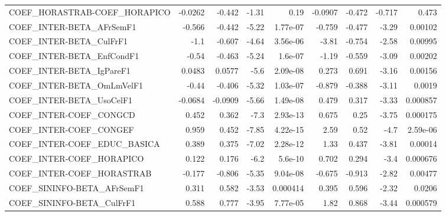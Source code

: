 \begin{tabular}{lrrrrrrrr}
COEF\_HORASTRAB-COEF\_HORAPICO          &     -0.0262 &       -0.442 &    -1.31 &     0.19 &    -0.0907 &      -0.472 &       -0.717 &         0.473 \\
COEF\_INTER-BETA\_AFrSemF1              &      -0.566 &       -0.442 &    -5.22 & 1.77e-07 &     -0.759 &      -0.477 &        -3.29 &       0.00102 \\
COEF\_INTER-BETA\_CulFrF1               &        -1.1 &       -0.607 &    -4.64 & 3.56e-06 &      -3.81 &      -0.754 &        -2.58 &       0.00995 \\
COEF\_INTER-BETA\_EnfCondF1             &       -0.54 &       -0.463 &    -5.24 &  1.6e-07 &      -1.19 &      -0.559 &        -3.09 &       0.00202 \\
COEF\_INTER-BETA\_IgPareF1              &      0.0483 &       0.0577 &     -5.6 & 2.09e-08 &      0.273 &       0.691 &        -3.16 &       0.00156 \\
COEF\_INTER-BETA\_OmLmVelF1             &       -0.44 &       -0.406 &    -5.32 & 1.03e-07 &     -0.879 &      -0.388 &        -3.11 &        0.0019 \\
COEF\_INTER-BETA\_UsoCelF1              &     -0.0684 &      -0.0909 &    -5.66 & 1.49e-08 &      0.479 &       0.317 &        -3.33 &      0.000857 \\
COEF\_INTER-COEF\_CONGCD                &       0.452 &        0.362 &     -7.3 & 2.93e-13 &      0.675 &        0.25 &        -3.75 &      0.000175 \\
COEF\_INTER-COEF\_CONGEF                &       0.959 &        0.452 &    -7.85 & 4.22e-15 &       2.59 &        0.52 &         -4.7 &      2.59e-06 \\
COEF\_INTER-COEF\_EDUC\_BASICA           &       0.389 &        0.375 &    -7.02 & 2.28e-12 &       1.33 &       0.437 &        -3.81 &       0.00014 \\
COEF\_INTER-COEF\_HORAPICO              &       0.122 &        0.176 &     -6.2 &  5.6e-10 &      0.702 &       0.294 &         -3.4 &      0.000676 \\
COEF\_INTER-COEF\_HORASTRAB             &      -0.177 &       -0.806 &    -5.35 & 9.04e-08 &     -0.675 &      -0.913 &        -2.82 &       0.00477 \\
COEF\_SININFO-BETA\_AFrSemF1            &       0.311 &        0.582 &    -3.53 & 0.000414 &      0.395 &       0.596 &        -2.32 &        0.0206 \\
COEF\_SININFO-BETA\_CulFrF1             &       0.588 &        0.777 &    -3.95 & 7.77e-05 &       1.82 &       0.868 &        -3.44 &      0.000579 \\

\end{tabular}
